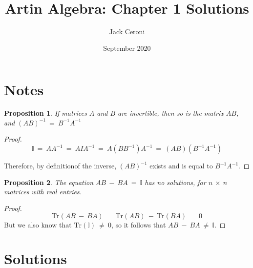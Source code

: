 \documentclass[10pt, oneside]{article}
\title{Artin Algebra: Chapter 1 Solutions}
\author{Jack Ceroni}
\date{September 2020}
\newtheorem{prop}{Proposition}
\newcommand{\tr}{\mathrm{Tr}}
\begin{document}
    \maketitle
    \tableofcontents

    \vspace{.25in}

    \section{Notes}

    \begin{prop}
      If matrices $A$ and $B$ are invertible, then so is the matrix $AB$, and $(AB)^{-1} \ = \ B^{-1} A^{-1}$
    \end{prop}

    \begin{proof}
      \begin{equation}
        \mathbb{I} \ = \ A A^{-1} \ = \ A I A^{-1} \ = \ A (B B^{-1}) A^{-1} \ = \ (AB) (B^{-1} A^{-1})
      \end{equation}

      Therefore, by definitionof the inverse, $(AB)^{-1}$ exists and is equal to $B^{-1} A^{-1}$.
    \end{proof}

    \begin{prop}
      The equation $AB \ - \ BA \ = \ \mathbb{I}$ has no solutions, for $n \ \times \ n$ matrices with  real entries.
    \end{prop}

    \begin{proof}
      \begin{equation}
        \tr{(AB \ - \ BA)} \ = \ \tr{(AB)} \ -\ \tr{(BA)} \ = \ 0
      \end{equation}
      But we also know that $\tr{(\mathbb{I})} \ \neq \ 0$, so it follows that $AB \ - \ BA \ \neq \ \mathbb{I}$.
      \end{proof}

    \section{Solutions}

    
\end{document}
